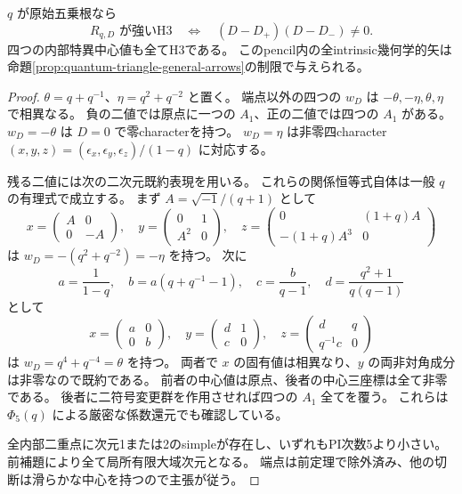 \begin{theorem}[位数5三角境界pencilの全H3切断]
\label{thm:quantum-triangle-order5}
$q$ が原始五乗根なら
\[
 R_{q,D}\text{ が強いH3}\quad\Longleftrightarrow\quad
 (D-D_+)(D-D_-)\ne0.
\]
四つの内部特異中心値も全てH3である。
このpencil内の全intrinsic幾何学的矢は
命題\ref{prop:quantum-triangle-general-arrows}の制限で与えられる。
\end{theorem}
\begin{proof}
$\theta=q+q^{-1}$、$\eta=q^2+q^{-2}$ と置く。
端点以外の四つの $w_D$ は $-\theta,-\eta,\theta,\eta$ で相異なる。
負の二値では原点に一つの $A_1$、正の二値では四つの $A_1$ がある。
$w_D=-\theta$ は $D=0$ で零characterを持つ。
$w_D=\eta$ は非零四character
$(x,y,z)=(\epsilon_x,\epsilon_y,\epsilon_z)/(1-q)$ に対応する。

残る二値には次の二次元既約表現を用いる。
これらの関係恒等式自体は一般 $q$ の有理式で成立する。
まず $A=\sqrt{-1}/(q+1)$ として
\[
 x=\begin{pmatrix}A&0\\0&-A\end{pmatrix},\quad
 y=\begin{pmatrix}0&1\\A^2&0\end{pmatrix},\quad
 z=\begin{pmatrix}0&(1+q)A\\-(1+q)A^3&0\end{pmatrix}
\]
は $w_D=-(q^2+q^{-2})=-\eta$ を持つ。
次に
\[
 a=\frac1{1-q},\quad b=a(q+q^{-1}-1),\quad
 c=\frac b{q-1},\quad d=\frac{q^2+1}{q(q-1)}
\]
として
\[
 x=\begin{pmatrix}a&0\\0&b\end{pmatrix},\quad
 y=\begin{pmatrix}d&1\\c&0\end{pmatrix},\quad
 z=\begin{pmatrix}d&q\\q^{-1}c&0\end{pmatrix}
\]
は $w_D=q^4+q^{-4}=\theta$ を持つ。
両者で $x$ の固有値は相異なり、$y$ の両非対角成分は非零なので既約である。
前者の中心値は原点、後者の中心三座標は全て非零である。
後者に二符号変更群を作用させれば四つの $A_1$ 全てを覆う。
これらは $\Phi_5(q)$ による厳密な係数還元でも確認している。

全内部二重点に次元1または2のsimpleが存在し、いずれもPI次数5より小さい。
前補題により全て局所有限大域次元となる。
端点は前定理で除外済み、他の切断は滑らかな中心を持つので主張が従う。
\end{proof}

